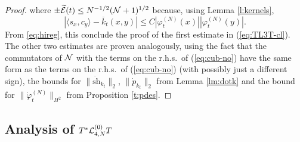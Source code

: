 \documentclass[11pt,a4paper]{article}
\newcommand{\wt}{\widetilde}
\newcommand{\cE}{{\cal E}}
\newcommand{\cL}{{\cal L}}
\newcommand{\cN}{{\cal N}}
\begin{document}
\begin{proof}
where $\pm \wt{\cE} (t) \leq N^{-1/2} (\cN+1)^{1/2}$ because, using Lemma \ref{l:kernels}, \[ |\langle s_x , c_y \rangle - \overline{k}_t (x,y)| \leq C |\varphi_t^{(N)} (x)| |\varphi_t^{(N)} (y)|.\] {F}rom  \eqref{eq:hireg}, this conclude the proof of the first estimate in (\ref{eq:TL3T-cl}). The other two estimates are proven analogously, using the fact that the commutators of $\cN$ with the terms on the r.h.s.\ of (\ref{eq:cub-no}) have the same form as the terms on the r.h.s.\ of (\ref{eq:cub-no}) (with possibly just a different sign), the bounds for $\| \dot{\text{sh}}_{k_t} \|_2$, $\| \dot{p}_{k_t} \|_2$ from Lemma \ref{lm:dotk} and the bound for $\| \dot{\varphi}_t^{(N)} \|_{H^2}$ from Proposition \ref{t:pdes}.
\end{proof}

\subsection{Analysis of $T^* \cL^{(0)}_{4,N} T$}
\end{document}
